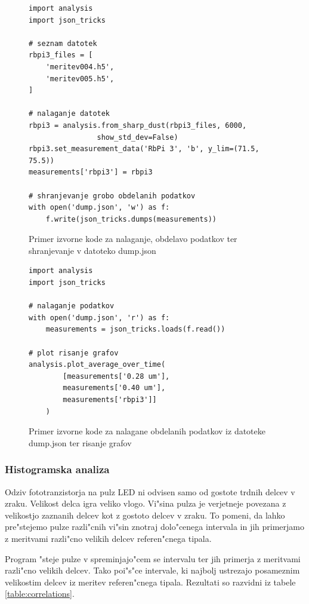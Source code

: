 \documentclass[11pt,a4paper]{article}
\begin{document}
\begin{figure}[H]
	\begin{lstlisting}[frame=single]
import analysis
import json_tricks

# seznam datotek
rbpi3_files = [
	'meritev004.h5',
	'meritev005.h5',
]

# nalaganje datotek
rbpi3 = analysis.from_sharp_dust(rbpi3_files, 6000,
				show_std_dev=False)
rbpi3.set_measurement_data('RbPi 3', 'b', y_lim=(71.5, 75.5))
measurements['rbpi3'] = rbpi3

# shranjevanje grobo obdelanih podatkov
with open('dump.json', 'w') as f:
	f.write(json_tricks.dumps(measurements))
	\end{lstlisting}
	\caption{Primer izvorne kode za nalaganje, obdelavo podatkov ter shranjevanje v datoteko dump.json}
	\label{dump-data}
\end{figure}

\begin{figure}[H]
	\begin{lstlisting}[frame=single]
import analysis
import json_tricks

# nalaganje podatkov
with open('dump.json', 'r') as f:
	measurements = json_tricks.loads(f.read())

# plot risanje grafov
analysis.plot_average_over_time(
		[measurements['0.28 um'],
		measurements['0.40 um'],
		measurements['rbpi3']]
	)

	\end{lstlisting}
	\caption{Primer izvorne kode za nalagane obdelanih podatkov iz datoteke dump.json ter risanje grafov}
	\label{plot-data}
\end{figure}


\subsubsection{Histogramska analiza}
Odziv fototranzistorja na pulz LED ni odvisen samo od gostote trdnih delcev v zraku. Velikost delca igra veliko vlogo. Vi"sina pulza je verjetneje povezana z velikostjo zaznanih delcev kot z gostoto delcev v zraku. To pomeni, da lahko pre"stejemo pulze razli"cnih vi"sin znotraj dolo"cenega intervala in jih primerjamo z meritvami razli"cno velikih delcev referen"cnega tipala.

Program "steje pulze v spreminjajo"cem se intervalu ter jih primerja z meritvami razli"cno velikih delcev. Tako poi"s"ce intervale, ki najbolj ustrezajo posameznim velikostim delcev iz meritev referen"cnega tipala. Rezultati so razvidni iz tabele \ref{table:correlations}.
\end{document}

